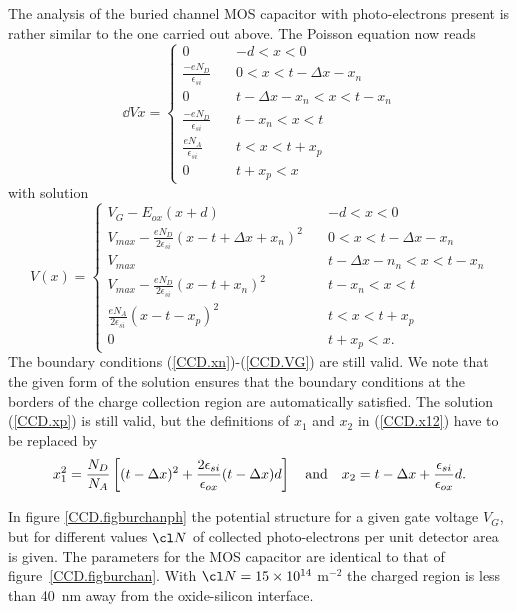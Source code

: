 The analysis of the buried channel MOS capacitor with photo-electrons
present is rather similar to the one carried out above. The Poisson
equation now reads
\begin{equation}
  \dd{V}{x} = \left\{ \begin{array}{ll} 
	0 & -d < x < 0 \\
	\frac{\displaystyle -eN_D}{\displaystyle \epsilon_{si}} \quad &
	0 < x < t-\Delta x -x_n \\
	0 & t-\Delta x -x_n < x < t -x_n \\
	\frac{\displaystyle -eN_D}{\displaystyle \epsilon_{si}} \quad &
	t-x_n < x < t \\
	\frac{\displaystyle eN_A}{\displaystyle\epsilon_{si}} & 
	t < x < t+x_p \\
	0 & t+x_p < x
  \end{array} \right.
  \label{CCD/.Poissonburph}
\end{equation}
with solution
\begin{equation}
  V(x) = \left\{ \begin{array}{ll} 
	V_G-E_{ox}(x+d) & -d < x < 0 \\
	V_{max} - \frac{\displaystyle
	eN_D}{\displaystyle 2\epsilon_{si}} (x-t+\Delta x +x_n)^2 \quad & 
	0 < x < t-\Delta x - x_n \\ 
	V_{max} & t-\Delta x - n_n < x < t - x_n \\
	V_{max} - \frac{\displaystyle
	eN_D}{\displaystyle 2\epsilon_{si}} (x-t+x_n)^2 \quad & 
	t - x_n < x < t \\ 
	\frac{\displaystyle eN_A}{\displaystyle
	2\epsilon_{si}}(x-t-x_p)^2 & t < x < t+x_p \\
	0 & t+x_p < x.
	\end{array} \right.
\end{equation}
The boundary conditions (\ref{CCD.xn})-(\ref{CCD.VG}) are still
valid. We note that the given form of the solution ensures that the
boundary conditions at the borders of the charge collection region are
automatically satisfied. The solution (\ref{CCD.xp}) is still
valid, but the definitions of $x_1$ and $x_2$ in (\ref{CCD.x12}) have
to be replaced by
\begin{equation}
  x_1^2 = \frac{N_D}{N_A}\left[(t-\Delta
  x)^2+\frac{2\epsilon_{si}}{\epsilon_{ox}}(t-\Delta x)d \right] 
  \quad {\rm and} \quad
  x_2 = t-\Delta x+\frac{\epsilon_{si}}{\epsilon_{ox}}d.
  \label{CCD.x12ph}
\end{equation}

In figure \ref{CCD.figburchanph} the potential structure for a given
gate voltage $V_G$, but for different values $\cl N$ of collected
photo-electrons per unit detector area is given. The parameters for
the MOS capacitor are identical to that of figure~\ref{CCD.figburchan}. 
With $\cl N = 15\times 10^{14}$ m$^{-2}$ the
charged region is less than 40~nm away from the oxide-silicon
interface.


